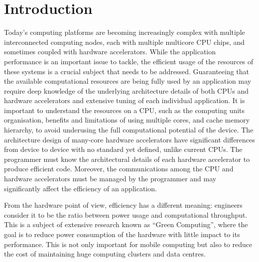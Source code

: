 
\chapter{Introduction}
\label{introduction}

Today's computing platforms are becoming increasingly complex with multiple interconnected computing nodes, each with multiple multicore CPU chips, and sometimes coupled with hardware accelerators. While the application performance is an important issue to tackle, the efficient usage of the resources of these systems is a crucial subject that needs to be addressed. Guaranteeing that the available computational resources are being fully used by an application may require deep knowledge of the underlying architecture details of both CPUs and hardware accelerators and extensive tuning of each individual application. It is important to understand the resources on a CPU, such as the computing units organisation, benefits and limitations of using multiple cores, and cache memory hierarchy, to avoid underusing the full computational potential of the device. The architecture design of many-core hardware accelerators have significant differences from device to device with no standard yet defined, unlike current CPUs. The programmer must know the architectural details of each hardware accelerator to produce efficient code. Moreover, the communications among the CPU and hardware accelerators must be managed by the programmer and may significantly affect the efficiency of an application.

From the hardware point of view, efficiency has a different meaning: engineers consider it to be the ratio between power usage and computational throughput. This is a subject of extensive research known as ``Green Computing'', where the goal is to reduce power consumption of the hardware with little impact to its performance. This is not only important for mobile computing but also to reduce the cost of maintaining huge computing clusters and data centres.

